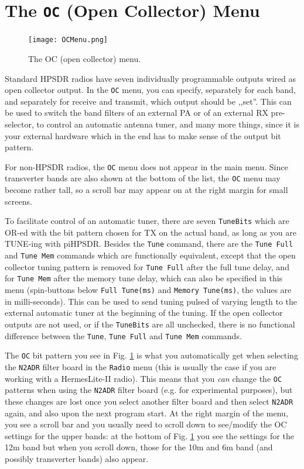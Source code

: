 \documentclass[12pt]{book}
\def\rett#1{\texttt{\color{red}#1}}
\def\bltt#1{\texttt{\color{blue}#1}}
\def\pH{pi\-HPSDR\xspace}
\begin{document}
\section{The \texttt{OC} (Open Collector) Menu}

\begin{figure}[ht]
\center
\texttt{[image: OCMenu.png]}
\caption{The OC (open collector) menu.}
\label{fig:OCMenu}
\end{figure}

Standard HPSDR radios have seven individually programmable outputs wired as
open collector output. In the \bltt{OC} menu, you can specify, separately
for each band, and separately for receive and transmit, which output should
be ,,set''. This can be used to switch the band filters of an external PA
or of an external RX pre-selector, to control an automatic antenna tuner,
and many more things, since it is
your external hardware which in the end has to make sense of the output
bit pattern.

For non-HPSDR radios, the \bltt{OC} menu does not appear in the main menu. Since
transverter bands are also shown at the bottom of the list, the \bltt{OC}
menu may become rather tall, so a scroll bar may appear on at the right
margin for small screens.

To facilitate control of an automatic tuner, there are seven \rett{TuneBits}
which are OR-ed with the bit pattern chosen for TX on the actual band,
as long as you are TUNE-ing with \pH. Besides the \bltt{Tune} command,
there are the \bltt{Tune Full} and \bltt{Tune Mem} commands which are
functionally equivalent, except that the open collector tuning pattern
is removed for \bltt{Tune Full} after the full tune delay, and for \bltt{Tune Mem}
after the memory tune delay, which can also be specified in this menu
(spin-buttons below \rett{Full Tune(ms)} and \rett{Memory Tune(ms)},
the values are in milli-seconds).
This can be used to send tuning pulsed of varying length to the
external automatic tuner at the beginning of the tuning. If the open collector
outputs are not used, or if the \rett{TuneBits}  are all unchecked, there is
no functional difference between the \bltt{Tune}, \bltt{Tune Full} and
\bltt{Tune Mem} commands.

The \bltt{OC} bit pattern you see in Fig. \ref{fig:OCMenu} is what you automatically
get when selecting the
\texttt{N2ADR} filter board in the \bltt{Radio} menu
(this is usually the
case if you are working with a HermesLite-II radio). This means that
you \textit{can} change the \bltt{OC} patterns when using the \texttt{N2ADR} filter board
(e.g. for experimental purposes), but
these changes are lost once you select another filter board and then select \texttt{N2ADR} again,
and also upon the next program start. At the right margin of the menu, you see a scroll bar
and you usually need to scroll down to see/modify the OC settings for the upper bands:
at the bottom of Fig. \ref{fig:OCMenu} you see the settings for the 12m band but when you
scroll down, those for the 10m and 6m band (and possibly transverter bands) also appear.
\end{document}
